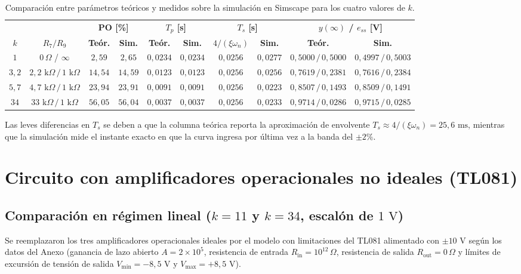 \documentclass[11pt,a4paper]{article}
\begin{document}
\begin{table}[H]
    \centering
    \small
    \begin{tabular}{c c c c c c c c c c}
        \toprule
        & & \multicolumn{2}{c}{\textbf{PO [\%]}} & \multicolumn{2}{c}{\textbf{$T_p$ [s]}} & \multicolumn{2}{c}{\textbf{$T_s$ [s]}} & \multicolumn{2}{c}{\textbf{$y(\infty)$ / $e_{ss}$ [V]}} \\
        \cmidrule(lr){3-4} \cmidrule(lr){5-6} \cmidrule(lr){7-8} \cmidrule(lr){9-10}
        \textbf{$k$} & \textbf{$R_7 / R_9$} & \textbf{Teór.} & \textbf{Sim.} & \textbf{Teór.} & \textbf{Sim.} & \textbf{$4/(\xi\omega_n)$} & \textbf{Sim.} & \textbf{Teór.} & \textbf{Sim.} \\
        \midrule
        $1$   & $0\,\Omega$ / $\infty$            & $2,59$  & $2,65$  & $0,0234$ & $0,0234$ & $0,0256$ & $0,0277$ & $0,5000\,/\,0,5000$ & $0,4997\,/\,0,5003$ \\
        $3,2$ & $2,2\text{ k}\Omega\,/\,1\text{ k}\Omega$ & $14,54$ & $14,59$ & $0,0123$ & $0,0123$ & $0,0256$ & $0,0256$ & $0,7619\,/\,0,2381$ & $0,7616\,/\,0,2384$ \\
        $5,7$ & $4,7\text{ k}\Omega\,/\,1\text{ k}\Omega$ & $23,94$ & $23,91$ & $0,0091$ & $0,0091$ & $0,0256$ & $0,0223$ & $0,8507\,/\,0,1493$ & $0,8509\,/\,0,1491$ \\
        $34$  & $33\text{ k}\Omega\,/\,1\text{ k}\Omega$  & $56,05$ & $56,04$ & $0,0037$ & $0,0037$ & $0,0256$ & $0,0233$ & $0,9714\,/\,0,0286$ & $0,9715\,/\,0,0285$ \\
        \bottomrule
    \end{tabular}
    \caption{Comparación entre parámetros teóricos y medidos sobre la simulación en Simscape para los cuatro valores de $k$.}
    \label{tab:punto5d}
\end{table}

Las leves diferencias en $T_s$ se deben a que la columna teórica reporta la aproximación de envolvente $T_s \approx 4/(\xi\omega_n) = 25,6\text{ ms}$, mientras que la simulación mide el instante exacto en que la curva ingresa por última vez a la banda del $\pm 2\%$.

\section{Circuito con amplificadores operacionales no ideales (TL081)}

\subsection{Comparación en régimen lineal ($k = 11$ y $k = 34$, escalón de $1\text{ V}$)}
Se reemplazaron los tres amplificadores operacionales ideales por el modelo con limitaciones del TL081 alimentado con $\pm 10\text{ V}$ según los datos del Anexo (ganancia de lazo abierto $A = 2 \times 10^5$, resistencia de entrada $R_{\text{in}} = 10^{12}\,\Omega$, resistencia de salida $R_{\text{out}} = 0\,\Omega$ y límites de excursión de tensión de salida $V_{\min} = -8,5\text{ V}$ y $V_{\max} = +8,5\text{ V}$).
\end{document}
